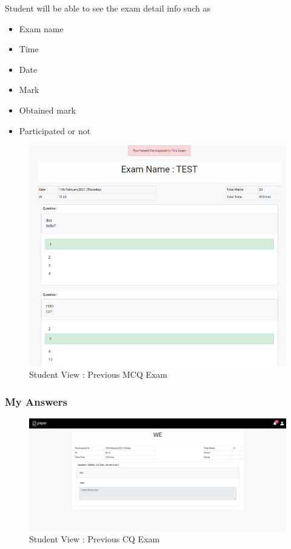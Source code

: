 \documentclass[10pt]{article}
\begin{document}
Student will be able to see the exam detail info such as

\begin{itemize}
  \item Exam name
  \item Time
  \item Date
  \item Mark
  \item Obtained mark
  \item Participated or not
\end{itemize}

\begin{figure}[H]
  \centering
  \centerline{\includegraphics[width=\textwidth,height=0.5\textheight]{studnt/previous-exam-non-participate.png}}
  \caption{Student View : Previous MCQ Exam}
  \label{fig}
\end{figure}

\subsubsection{My Answers}

\begin{figure}[H]
  \centering
  \centerline{\includegraphics[width=\textwidth]{studnt/previous cq.png}}
  \caption{Student View : Previous CQ Exam}
  \label{fig}
\end{figure}
\end{document}
